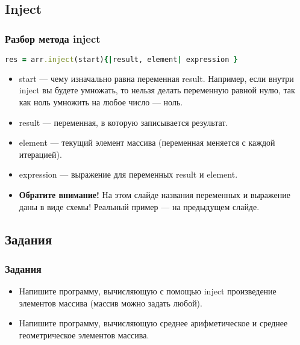 \documentclass[compress,red]{beamer}
\begin{document}
\subsection{Inject}
\begin{frame}[fragile]
  \frametitle{Разбор метода inject}

  \begin{lstlisting}[language=ruby,basicstyle=\footnotesize,label=ruby6,caption=Общий вид inject]
    res = arr.inject(start){|result, element| expression }
  \end{lstlisting}
  
  \begin{itemize}
    \item start --- чему изначально равна переменная result. Например, если внутри inject вы будете умножать, то нельзя делать переменную равной нулю, так как ноль умножить на любое число --- ноль.
    \item result --- переменная, в которую записывается результат.
    \item element --- текущий элемент массива (переменная меняется с каждой итерацией).
    \item expression --- выражение для переменных result и element.
    \item \textbf{Обратите внимание!} На этом слайде названия переменных и выражение даны в виде схемы! Реальный пример --- на предыдущем слайде.
  \end{itemize}
  
\end{frame}

\subsection{Задания}
\begin{frame}
  \frametitle{Задания}
  \begin{itemize}
    \item Напишите программу, вычисляющую с помощью inject произведение элементов массива (массив можно задать любой).
    \item Напишите программу, вычисляющую среднее арифметическое и среднее геометрическое элементов массива.
  \end{itemize}
\end{frame}
\end{document}
